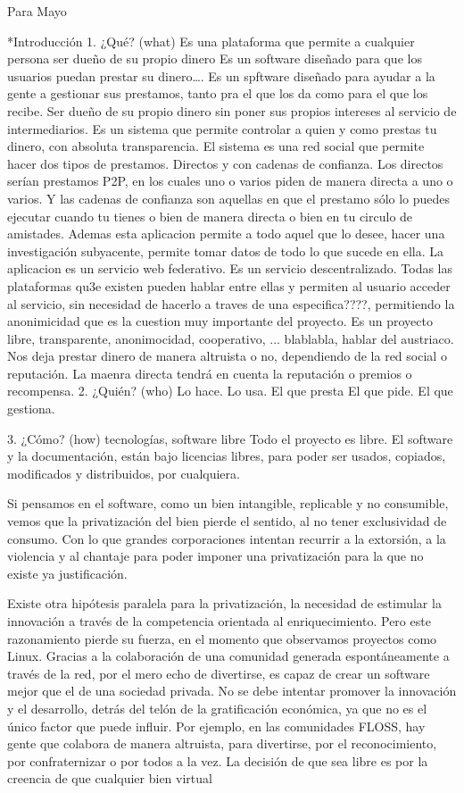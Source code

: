 Para Mayo

*Introducción
1. ¿Qué? (what)
Es una plataforma que permite a cualquier persona ser dueño de su propio dinero
Es un software diseñado para que los usuarios puedan prestar su dinero….
Es un spftware diseñado para ayudar a la gente a gestionar sus prestamos, tanto pra el que los da como para el que los recibe. Ser dueño de su propio dinero sin poner sus propios intereses al servicio de intermediarios. Es un sistema que permite controlar a quien y como prestas tu dinero, con absoluta transparencia. El sistema es una red social que permite hacer dos tipos de prestamos. Directos y con cadenas de confianza. Los directos serían prestamos P2P, en los cuales uno o varios piden de manera directa a uno o varios. Y las cadenas de confianza son aquellas en que el prestamo sólo lo puedes ejecutar cuando tu tienes o bien de manera directa o bien en tu circulo de amistades. Ademas esta aplicacion permite a todo aquel que lo desee, hacer una investigación subyacente, permite tomar datos de todo lo que sucede en ella. La aplicacion es un servicio web federativo. Es un servicio descentralizado. Todas las plataformas qu3e existen pueden hablar entre ellas y permiten al usuario acceder al servicio, sin necesidad de hacerlo a traves de una especifica????, permitiendo la anonimicidad que es la cuestion muy importante del proyecto. Es un proyecto libre, transparente, anonimocidad, cooperativo, ... blablabla, hablar del austriaco. Nos deja prestar dinero de manera altruista o no, dependiendo de la red social o reputación. La maenra directa tendrá en cuenta la reputación o premios o recompensa.
2. ¿Quién? (who) 
Lo hace. 
Lo usa.
El que presta
El que pide.
El que gestiona.

3. ¿Cómo? (how)
tecnologías, software libre
Todo el proyecto es libre. El software y la documentación, están bajo licencias libres, para poder ser usados, copiados, modificados y distribuidos, por cualquiera.

Si pensamos en el software, como un bien intangible, replicable y no consumible, vemos que la privatización del bien pierde el sentido, al no tener exclusividad de consumo. Con lo que grandes corporaciones intentan recurrir a la extorsión, a la violencia y al chantaje para poder imponer una privatización para la que no existe ya justificación. \cite{Bifo Cap. Fraternidad, saber, no saber}

Existe otra hipótesis paralela para la privatización, la necesidad de estimular la innovación a través de la competencia orientada al enriquecimiento. Pero este razonamiento pierde su fuerza, en el momento que observamos proyectos como Linux. Gracias a la colaboración de una comunidad generada espontáneamente a través de la red, por el mero echo de divertirse, es capaz de crear un software mejor que el de una sociedad privada. No se debe intentar promover la innovación y el desarrollo, detrás del telón de la gratificación económica, ya que no es el único factor que puede influir. Por ejemplo, en las comunidades FLOSS, hay gente que colabora de manera altruista, para divertirse, por el reconocimiento, por confraternizar o por todos a la vez. \cite{Bifo Cap. Fraternidad, saber, no saber}
La decisión de que sea libre es por la creencia de que cualquier bien virtual

